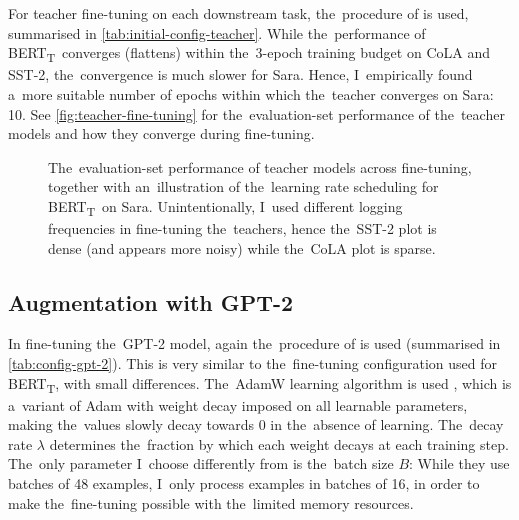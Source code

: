 \documentclass[bsc,frontabs,singlespacing,parskip,deptreport]{infthesis}
\def\BERTT{BERT\textsubscript{T}}
\begin{document}
{{{      For teacher fine-tuning on each downstream task, the~procedure of \citeauthor{Tang_2019b} is used, summarised in \autoref{tab:initial-config-teacher}.
      While the~performance of \BERTT~converges (flattens) within the~3-epoch training budget on CoLA and SST-2, the~convergence is much slower for Sara. Hence, I~empirically found a~more suitable number of epochs within which the~teacher converges on Sara: 10. See \autoref{fig:teacher-fine-tuning} for the~evaluation-set performance of the~teacher models and how they converge during fine-tuning.
      \begin{figure}[h!t]
        \centering
        \caption{The~evaluation-set performance of teacher models across fine-tuning, together with an~illustration of the~learning rate scheduling for \BERTT~on Sara. Unintentionally, I~used different logging frequencies in fine-tuning the~teachers, hence the~SST-2 plot is dense (and appears more noisy) while the~CoLA plot is sparse.}
        \label{fig:teacher-fine-tuning}
      \end{figure}
    }

    \subsection{Augmentation with GPT-2}{
      In fine-tuning the~GPT-2 model, again the~procedure of \citeauthor{Tang_2019b} is used (summarised in \autoref{tab:config-gpt-2}). This is very similar to the~fine-tuning configuration used for \BERTT, with small differences. The~AdamW learning algorithm is used \citep{Loshchilov_2019}, which is a~variant of Adam with weight decay imposed on all learnable parameters, making the~values slowly decay towards 0 in the~absence of learning. The~decay rate $\lambda$ determines the~fraction by which each weight decays at each training step.
      The~only parameter I~choose differently from \citeauthor{Tang_2019b} is the~batch size $B$: While they use batches of 48 examples, I~only process examples in batches of 16, in order to make the~fine-tuning possible with the~limited memory resources.

}}}
\end{document}

